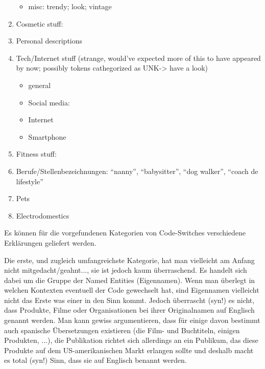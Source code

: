 \begin{enumerate}
\begin{itemize}
      \item misc: trendy; look; vintage
    \end{itemize}
  \item Cosmetic stuff:
  \item Personal descriptions
  \item Tech/Internet stuff (strange, would've expected more of this to have appeared by now; possibly tokens cathegorized as UNK-> have a look)
    \begin{itemize}
      \item general
      \item Social media:
      \item Internet
      \item Smartphone
    \end{itemize}
  \item Fitness stuff:
  \item Berufe/Stellenbezeichnungen: ``nanny'', ``babysitter'', ``dog walker'', ``coach de lifestyle''
  \item Pets
  \item Electrodomestics
\end{enumerate}

Es können für die vorgefundenen Kategorien von Code-Switches verschiedene Erklärungen geliefert werden.

Die erste, und zugleich umfangreichste Kategorie, hat man vielleicht am Anfang nicht mitgedacht/geahnt..., sie ist jedoch kaum überraschend.
Es handelt sich dabei um die Gruppe der Named Entities (Eigennamen).
Wenn man überlegt in welchen Kontexten eventuell der Code gewechselt hat, sind Eigennamen vielleicht nicht das Erste was einer in den Sinn kommt.
Jedoch überrascht (syn!) es nicht, dass Produkte, Filme oder Organisationen bei ihrer Originalnamen auf Englisch genannt werden.
Man kann gewiss argumentieren, dass für einige davon bestimmt auch spanische Übersetzungen existieren (die Film- und Buchtiteln, einigen Produkten, ...), die Publikation richtet sich allerdings an ein Publikum, das diese Produkte auf dem US-amerikanischen Markt erlangen sollte und deshalb macht es total (syn!) Sinn, dass sie auf Englisch benannt werden.


